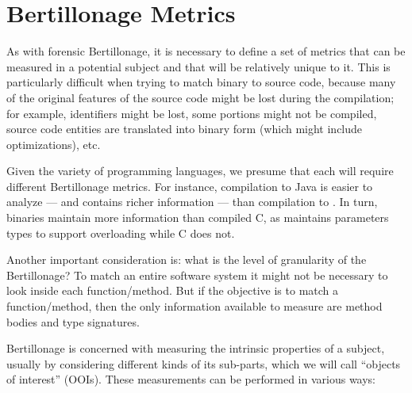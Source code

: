 \section{Bertillonage Metrics}

As with forensic Bertillonage, it is necessary to define a set of metrics
that can be measured in a potential subject and that will be relatively
unique to it.  This is particularly difficult when trying to match binary
to source code, because many of the original features of the source code
might be lost during the compilation; for example, identifiers might be
lost, some portions might not be compiled, source code entities are
translated into binary form (which might include optimizations), etc.

Given the variety of programming languages, we presume that each will
require different Bertillonage metrics. For instance, compilation to Java
is easier to analyze --- and contains richer information --- than
compilation to \Cpp. In turn, \Cpp binaries maintain more information than
compiled C, as \Cpp maintains parameters types to support overloading while
C does not.

Another important consideration is: what is the level of granularity of the
Bertillonage? To match an entire software system it might not be necessary
to look inside each function/method. But if the objective is to match a
function/method, then the only information available to measure are method
bodies and type signatures.

Bertillonage is concerned with measuring the intrinsic properties of a
subject, usually by considering different kinds of its sub-parts, which we
will call ``objects of interest'' (OOIs).  These measurements can be
performed in various ways:

